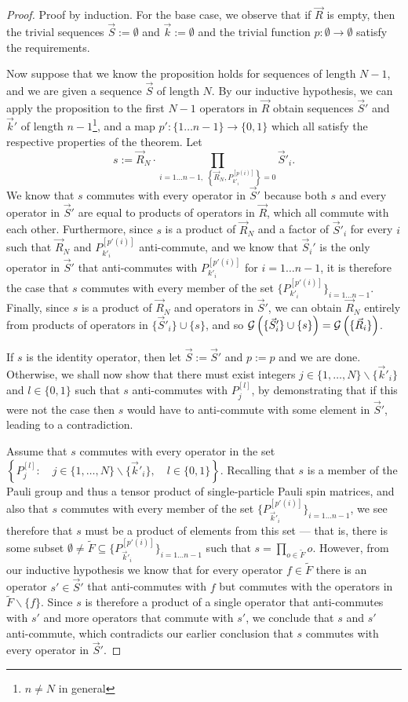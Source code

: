 \documentclass[twocolumn,showpacs,preprintnumbers,amsmath,amssymb,nofootinbib,pra,floatfix]{revtex4-1}
\newcommand{\lst}{\vec}
\newcommand{\set}{\tilde}
\newcommand{\genfun}{\mathcal{G}}
\begin{document}
\begin{proof}
Proof by induction.  For the base case, we observe that if $\lst R$ is empty, then the trivial sequences $\lst S:=\emptyset$ and $\lst k :=\emptyset$ and the trivial function $p:\emptyset\to\emptyset$ satisfy the requirements.

Now suppose that we know the proposition holds for sequences of length $N-1$, and we are given a sequence $\lst S$ of length $N$.  By our inductive hypothesis, we can apply the proposition to the first $N-1$ operators in $\lst R$ obtain sequences $\lst S'$ and $\lst k'$ of length $n-1$\footnote{$n\ne N$ in general}, and a map $p':\{1\dots n-1\}\to \{0,1\}$ which all satisfy the respective properties of the theorem.  Let $$s:=\lst R_N\cdot \prod_{i=1\dots n-1, \,\,\left\{\lst R_N,P_{k'_i}^{[p(i)]}\right\}=0} \lst S'_i.$$  We know that $s$ commutes with every operator in $\lst S'$ because both $s$ and every operator in $\lst S'$ are equal to products of operators in $\lst R$, which all commute with each other.  Furthermore, since $s$ is a product of $\lst R_N$ and a factor of $\lst S'_i$ for every $i$ such that $\lst R_N$ and $P_{k'_i}^{[p'(i)]}$ anti-commute, and we know that $\lst S_i'$ is the only operator in $\lst S'$ that anti-commutes with $P_{k'_i}^{[p'(i)]}$ for $i=1\dots n-1$, it is therefore the case that $s$ commutes with every member of the set $\{P_{k'_i}^{[p'(i)]}\}_{i=1\dots n-1}$.  Finally, since $s$ is a product of $\lst R_N$ and operators in $\lst S'$, we can obtain $\lst R_N$ entirely from products of operators in $\{\lst S'_i\} \cup \{s\}$, and so $\genfun\paren{\{\lst S'_i\} \cup \{s\}}=\genfun\paren{\{\lst R_i\}}$.

If $s$ is the identity operator, then let $\lst S:=\lst S'$ and $p:=p$ and we are done.  Otherwise, we shall now show that there must exist integers $j\in\{1,\dots,N\}\backslash\{\lst k'_i\}$ and $l\in\{0,1\}$ such that $s$ anti-commutes with $P_{j}^{[l]}$, by demonstrating that if this were not the case then $s$ would have to anti-commute with some element in $\lst S'$, leading to a contradiction.

Assume that $s$ commutes with every operator in the set $\left\{P_j^{[l]}:\quad j\in\{1,\dots,N\}\backslash\{\lst k'_i\}, \quad l\in\{0,1\}\right\}.$  Recalling that $s$ is a member of the Pauli group and thus a tensor product of single-particle Pauli spin matrices, and also that $s$ commutes with every member of the set $\{P_{\lst k'_i}^{[p'(i)]}\}_{i=1\dots n-1}$, we see therefore that $s$ must be a product of elements from this set --- that is, there is some subset $\emptyset \ne \set F \subseteq \{P_{\lst k'_i}^{[p'(i)]}\}_{i=1\dots n-1}$ such that $s=\prod_{o\in \set F} o$.  However, from our inductive hypothesis we know that for every operator $f\in\set F$ there is an operator $s'\in\lst S'$ that anti-commutes with $f$ but commutes with the operators in $\set F\backslash\{f\}$.  Since $s$ is therefore a product of a single operator that anti-commutes with $s'$ and more operators that commute with $s'$, we conclude that $s$ and $s'$ anti-commute, which contradicts our earlier conclusion that $s$ commutes with every operator in $\lst S'$.


\end{proof}
\end{document}
